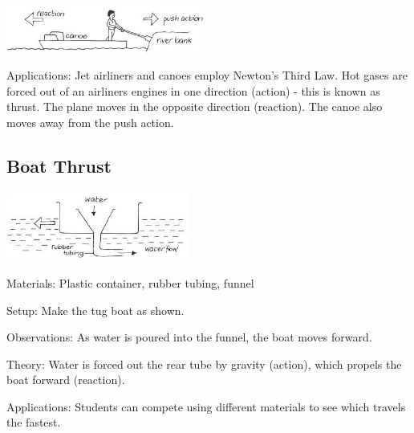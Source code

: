 \begin{multicols}{2}
\begin{center}
\includegraphics[width=0.49\textwidth]{./img/vso/canoe-push.jpg}
\end{center}

\begin{description*}
\item[Applications:]{Jet airliners and canoes employ Newton's Third Law. Hot gases are forced out of an airliners engines in one direction (action) - this is known as thrust. The plane moves in the opposite direction (reaction). The canoe also moves away from the push action.}
\end{description*}

\subsection{Boat Thrust}

\begin{center}
\includegraphics[width=0.45\textwidth]{./img/vso/boat-thrust.jpg}
\end{center}

\begin{description*}
\item[Materials:]{Plastic container, rubber tubing, funnel}
\item[Setup:]{Make the tug boat as shown. }
\item[Observations:]{As water is poured into the funnel, the boat moves forward.}
\item[Theory:]{Water is forced out the rear tube by gravity (action), which propels the boat forward (reaction).}
\item[Applications:]{Students can compete using different materials to see which travels the fastest.}
\end{description*}


\end{multicols}
